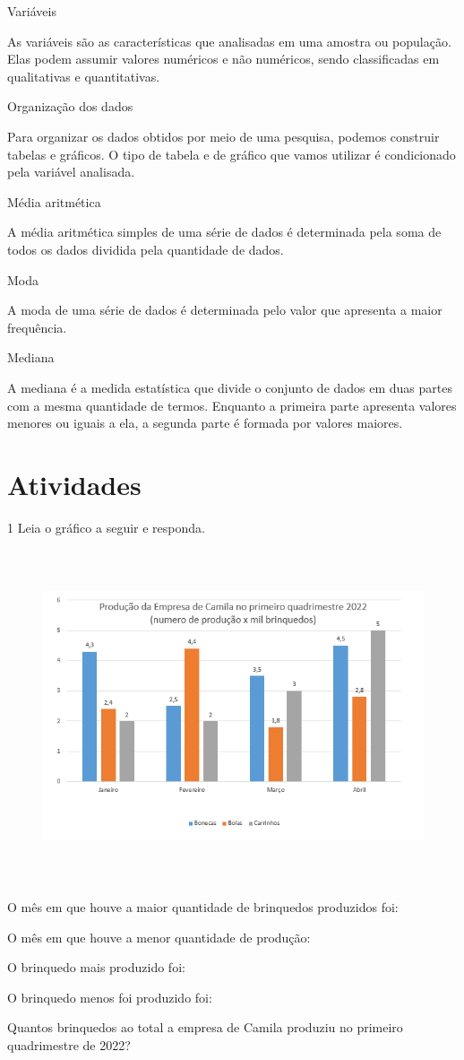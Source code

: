 Variáveis

As variáveis são as características que analisadas em uma amostra ou
população. Elas podem assumir valores numéricos e não numéricos, sendo
classificadas em qualitativas e quantitativas.

Organização dos dados

Para organizar os dados obtidos por meio de uma pesquisa, podemos
construir tabelas e gráficos. O tipo de tabela e de gráfico que vamos
utilizar é condicionado pela variável analisada.

Média aritmética

A média aritmética simples de uma série de dados é determinada pela soma
de todos os dados dividida pela quantidade de dados.

Moda

A moda de uma série de dados é determinada pelo valor que apresenta a
maior frequência.

Mediana

A mediana é a medida estatística que divide o conjunto de dados em duas
partes com a mesma quantidade de termos. Enquanto a primeira parte
apresenta valores menores ou iguais a ela, a segunda parte é formada por
valores maiores.

\section{Atividades}

\num{1} Leia o gráfico a seguir e responda.

\begin{figure}[H]
\centering\includegraphics[width=5.90625in,height=3.86458in]{./imgSAEB_8_MAT/media/image39.png}
\end{figure}
\item O mês em que houve a maior quantidade de brinquedos produzidos foi:
\item O mês em que houve a menor quantidade de produção:
\item O brinquedo mais produzido foi:
\item O brinquedo menos foi produzido foi:
\item Quantos brinquedos ao total a empresa de Camila produziu no primeiro
quadrimestre de 2022?

